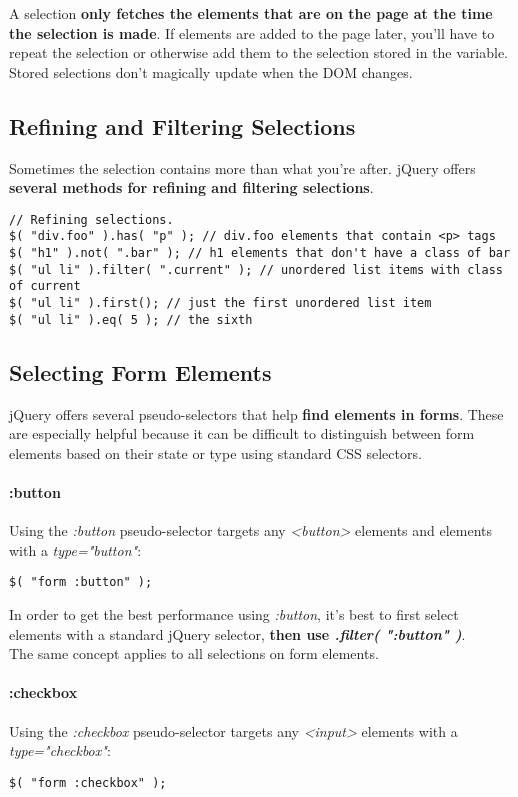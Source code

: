 \documentclass[10pt,letterpaper]{report}
\begin{document}
A selection \textbf{only fetches the elements that are on the page at the time the selection is made}. If elements are added to the page later, you'll have to repeat the selection or otherwise add them to the selection stored in the variable. Stored selections don't magically update when the DOM changes.

\subsection{Refining and Filtering Selections}
Sometimes the selection contains more than what you're after. jQuery offers \textbf{several methods for refining and filtering selections}.
\begin{lstlisting}
// Refining selections.
$( "div.foo" ).has( "p" ); // div.foo elements that contain <p> tags
$( "h1" ).not( ".bar" ); // h1 elements that don't have a class of bar
$( "ul li" ).filter( ".current" ); // unordered list items with class of current
$( "ul li" ).first(); // just the first unordered list item
$( "ul li" ).eq( 5 ); // the sixth
\end{lstlisting}
\subsection{Selecting Form Elements}
jQuery offers several pseudo-selectors that help \textbf{find elements in forms}. These are especially helpful because it can be difficult to distinguish between form elements based on their state or type using standard CSS selectors.
\paragraph{:button}

Using the \textit{:button} pseudo-selector targets any \textit{<button>} elements and elements with a \textit{type="button"}:
\begin{lstlisting}
$( "form :button" );
\end{lstlisting}
In order to get the best performance using \textit{:button}, it's best to first select elements with a standard jQuery selector, \textbf{then use \textit{.filter( ":button" )}}.\\
The same concept applies to all selections on form elements.
\paragraph{:checkbox}
Using the \textit{:checkbox} pseudo-selector targets any \textit{<input>} elements with a \textit{type="checkbox"}:
\begin{lstlisting}
$( "form :checkbox" );
\end{lstlisting}
\end{document}
